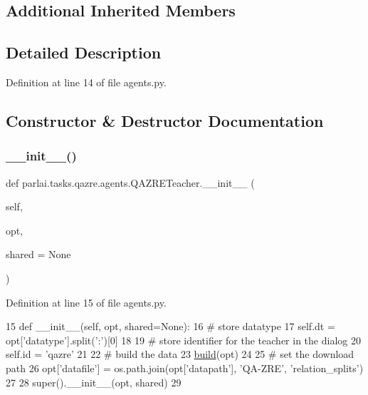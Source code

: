 \subsection*{Additional Inherited Members}


\subsection{Detailed Description}


Definition at line 14 of file agents.\+py.



\subsection{Constructor \& Destructor Documentation}
\mbox{\label{classparlai_1_1tasks_1_1qazre_1_1agents_1_1QAZRETeacher_aca6be88f2ece62ebd551337e277a8ca3}} 
\subsubsection{\texorpdfstring{\+\_\+\+\_\+init\+\_\+\+\_\+()}{\_\_init\_\_()}}
{\footnotesize\ttfamily def parlai.\+tasks.\+qazre.\+agents.\+Q\+A\+Z\+R\+E\+Teacher.\+\_\+\+\_\+init\+\_\+\+\_\+ (\begin{DoxyParamCaption}\item[{}]{self,  }\item[{}]{opt,  }\item[{}]{shared = {\ttfamily None} }\end{DoxyParamCaption})}



Definition at line 15 of file agents.\+py.


\begin{DoxyCode}
15     \textcolor{keyword}{def }\_\_init\_\_(self, opt, shared=None):
16         \textcolor{comment}{# store datatype}
17         self.dt = opt[\textcolor{stringliteral}{'datatype'}].split(\textcolor{stringliteral}{':'})[0]
18 
19         \textcolor{comment}{# store identifier for the teacher in the dialog}
20         self.id = \textcolor{stringliteral}{'qazre'}
21 
22         \textcolor{comment}{# build the data}
23         \hyperlink{namespaceparlai_1_1mturk_1_1tasks_1_1talkthewalk_1_1download_a8c0fbb9b6dfe127cb8c1bd6e7c4e33fd}{build}(opt)
24 
25         \textcolor{comment}{# set the download path}
26         opt[\textcolor{stringliteral}{'datafile'}] = os.path.join(opt[\textcolor{stringliteral}{'datapath'}], \textcolor{stringliteral}{'QA-ZRE'}, \textcolor{stringliteral}{'relation\_splits'})
27 
28         super().\_\_init\_\_(opt, shared)
29 
\end{DoxyCode}


